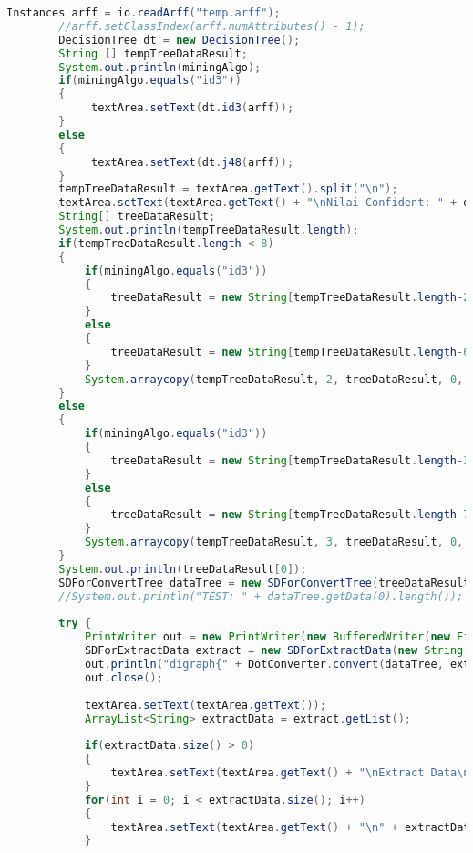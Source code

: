 \begin{lstlisting}[language=Java,basicstyle=\tiny,caption=Controller.java]
        Instances arff = io.readArff("temp.arff");
        //arff.setClassIndex(arff.numAttributes() - 1);
        DecisionTree dt = new DecisionTree();
        String [] tempTreeDataResult;
        System.out.println(miningAlgo);
        if(miningAlgo.equals("id3"))
        {
             textArea.setText(dt.id3(arff));
        }
        else
        {
             textArea.setText(dt.j48(arff));
        }
        tempTreeDataResult = textArea.getText().split("\n");
        textArea.setText(textArea.getText() + "\nNilai Confident: " + dt.calculatePrecision(arff) + "\n");
        String[] treeDataResult;
        System.out.println(tempTreeDataResult.length);
        if(tempTreeDataResult.length < 8)
        {
            if(miningAlgo.equals("id3"))
            {
                treeDataResult = new String[tempTreeDataResult.length-2];
            }
            else
            {
                treeDataResult = new String[tempTreeDataResult.length-6];
            }
            System.arraycopy(tempTreeDataResult, 2, treeDataResult, 0, treeDataResult.length);
        }
        else
        {
            if(miningAlgo.equals("id3"))
            {
                treeDataResult = new String[tempTreeDataResult.length-3];
            }
            else
            {
                treeDataResult = new String[tempTreeDataResult.length-7];
            }
            System.arraycopy(tempTreeDataResult, 3, treeDataResult, 0, treeDataResult.length);
        }
        System.out.println(treeDataResult[0]);
        SDForConvertTree dataTree = new SDForConvertTree(treeDataResult);
        //System.out.println("TEST: " + dataTree.getData(0).length());
        
        try {
            PrintWriter out = new PrintWriter(new BufferedWriter(new FileWriter("tree.txt")));
            SDForExtractData extract = new SDForExtractData(new String[]{"bulan", "tahun", "hari", "jam"},new int[]{maxMin[0],maxMin[1],7,24}, new int[]{maxMin[2],maxMin[3],1,0});
            out.println("digraph{" + DotConverter.convert(dataTree, extract, miningAlgo, 0, "") + "}");
            out.close();
            
            textArea.setText(textArea.getText());
            ArrayList<String> extractData = extract.getList();
            
            if(extractData.size() > 0)
            {
                textArea.setText(textArea.getText() + "\nExtract Data\n");
            }
            for(int i = 0; i < extractData.size(); i++)
            {
                textArea.setText(textArea.getText() + "\n" + extractData.get(i));
            }
            

\end{lstlisting}
